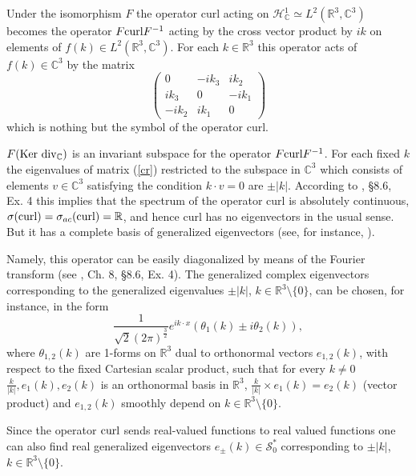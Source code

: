 \documentclass{amsart}
\begin{document}
Under the isomorphism $F$ the operator curl acting on $\mathcal{H}^1_{\mathbb{C}}\simeq L^2(\mathbb{R}^3,\mathbb{C}^3)$ becomes the operator $F{\rm curl}F^{-1}$ acting by the cross vector product by $ik$ on elements of $f(k)\in L^2(\mathbb{R}^3,\mathbb{C}^3)$. For each $k\in \mathbb{R}^3$ this operator acts of $f(k)\in \mathbb{C}^3$ by the matrix 
\begin{equation}\label{cr}
\left(\begin{array}{ccc}
0 & -ik_3 & ik_2 \\
ik_3 & 0 & -ik_1 \\
-ik_2 & ik_1 & 0
\end{array}
\right)
\end{equation}
which is nothing but the symbol of the operator curl. 

$F({\rm Ker~div}_{\mathbb{C}})$ is an invariant subspace for the operator $F{\rm curl}F^{-1}$. For each fixed $k$ the eigenvalues of matrix (\ref{cr}) restricted to the subspace in $\mathbb{C}^3$ which consists of elements $v\in \mathbb{C}^3$ satisfying the condition $k\cdot v=0$ are $\pm |k|$. 
According to \cite{BS3}, \S 8.6, Ex. 4 this implies that the spectrum of the operator curl is absolutely continuous, $\sigma({\rm curl})=\sigma_{ac}({\rm curl})=\mathbb{R}$,
and hence curl has no eigenvectors in the usual sense. But it has a complete basis of generalized eigenvectors (see, for instance, \cite{GV}).

Namely, this operator can be easily diagonalized by means of
the Fourier transform (see \cite{BS3}, Ch. 8, \S 8.6, Ex. 4). The generalized complex eigenvectors corresponding to the generalized
eigenvalues $\pm |k|$, $k\in \mathbb{R}^3\setminus \{ 0 \}$, can be chosen, for instance, in the form
\begin{equation}\label{roteigen}
\frac{1}{\sqrt{2}(2\pi)^{\frac{3}{2}}}e^{ik\cdot x}(\theta_1(k)\pm
i\theta_2(k)),
\end{equation}
where $\theta_{1,2}(k)$ are 1-forms on $\mathbb{R}^3$ dual to orthonormal vectors
$e_{1,2}(k)$, with respect to the fixed Cartesian scalar product, such that for
every $k\neq 0$ $\frac{k}{|k|},e_1(k),e_2(k)$ is an orthonormal basis in
$\mathbb{R}^{3}$, $\frac{k}{|k|}\times e_1(k)=e_2(k)$ (vector product) and
$e_{1,2}(k)$ smoothly depend on $k\in \mathbb{R}^{3}\setminus \{ 0\}$.

Since the operator ${\rm curl}$ sends real-valued functions to real valued functions one can also find real generalized eigenvectors $e_{\pm}(k)\in \mathcal{S}_0^*$ corresponding to $\pm |k|$, $k\in \mathbb{R}^3\setminus \{ 0 \}$.
\end{document}
